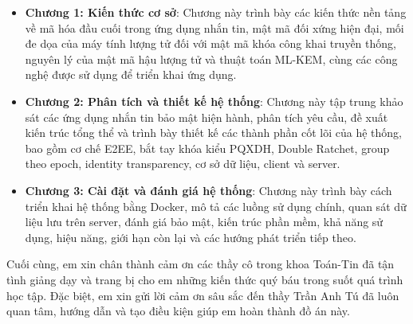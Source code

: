 \begin{itemize}
  \item \textbf{Chương 1: Kiến thức cơ sở}: Chương này trình bày các kiến thức nền tảng về mã hóa đầu cuối trong ứng dụng nhắn tin, mật mã đối xứng hiện đại, mối đe dọa của máy tính lượng tử đối với mật mã khóa công khai truyền thống, nguyên lý của mật mã hậu lượng tử và thuật toán ML-KEM, cùng các công nghệ được sử dụng để triển khai ứng dụng.
  \item \textbf{Chương 2: Phân tích và thiết kế hệ thống}: Chương này tập trung khảo sát các ứng dụng nhắn tin bảo mật hiện hành, phân tích yêu cầu, đề xuất kiến trúc tổng thể và trình bày thiết kế các thành phần cốt lõi của hệ thống, bao gồm cơ chế E2EE, bắt tay khóa kiểu PQXDH, Double Ratchet, group theo epoch, identity transparency, cơ sở dữ liệu, client và server.
  \item \textbf{Chương 3: Cài đặt và đánh giá hệ thống}: Chương này trình bày cách triển khai hệ thống bằng Docker, mô tả các luồng sử dụng chính, quan sát dữ liệu lưu trên server, đánh giá bảo mật, kiến trúc phần mềm, khả năng sử dụng, hiệu năng, giới hạn còn lại và các hướng phát triển tiếp theo.
\end{itemize}

Cuối cùng, em xin chân thành cảm ơn các thầy cô trong khoa Toán-Tin đã tận tình giảng dạy và trang bị cho em những kiến thức quý báu trong suốt quá trình học tập. Đặc biệt, em xin gửi lời cảm ơn sâu sắc đến thầy Trần Anh Tú đã luôn quan tâm, hướng dẫn và tạo điều kiện giúp em hoàn thành đồ án này.
